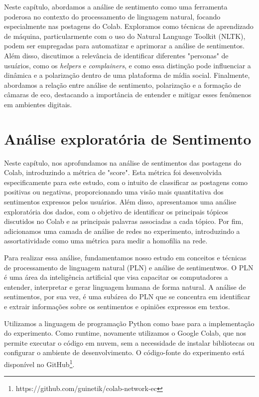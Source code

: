 Neste capítulo, abordamos a análise de sentimento como uma ferramenta poderosa no contexto do processamento de linguagem natural, focando especialmente nas postagens do Colab. Exploramos como técnicas de aprendizado de máquina, particularmente com o uso do Natural Language Toolkit (NLTK), podem ser empregadas para automatizar e aprimorar a análise de sentimentos. Além disso, discutimos a relevância de identificar diferentes "personas" de usuários, como os \textit{helpers} e \textit{complainers}, e como essa distinção pode influenciar a dinâmica e a polarização dentro de uma plataforma de mídia social. Finalmente, abordamos a relação entre análise de sentimento, polarização e a formação de câmaras de eco, destacando a importância de entender e mitigar esses fenômenos em ambientes digitais.

\section{Análise exploratória de Sentimento}

Neste capítulo, nos aprofundamos na análise de sentimentos das postagens do Colab, introduzindo a métrica de "score". Esta métrica foi desenvolvida especificamente para este estudo, com o intuito de classificar as postagens como positivas ou negativas, proporcionando uma visão mais quantitativa dos sentimentos expressos pelos usuários. Além disso, apresentamos uma análise exploratória dos dados, com o objetivo de identificar os principais tópicos discutidos no Colab e as principais palavras associadas a cada tópico. Por fim, adicionamos uma camada de análise de redes no experimento, introduzindo a assortatividade como uma métrica para medir a homofilia na rede.

Para realizar essa análise, fundamentamos nosso estudo em conceitos e técnicas de processamento de linguagem natural (PLN) e análise de sentimentwos. O PLN é uma área da inteligência artificial que visa capacitar os computadores a entender, interpretar e gerar linguagem humana de forma natural. A análise de sentimentos, por sua vez, é uma subárea do PLN que se concentra em identificar e extrair informações sobre os sentimentos e opiniões expressos em textos.

Utilizamos a linguagem de programação Python como base para a implementação do experimento. Como runtime, novamente utilizamos o Google Colab, que nos permite executar o código em nuvem, sem a necessidade de instalar bibliotecas ou configurar o ambiente de desenvolvimento. O código-fonte do experimento está disponível no GitHub\footnote{https://github.com/guinetik/colab-network-ec}.

